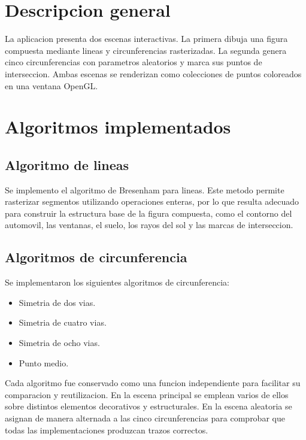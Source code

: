 \documentclass[12pt,a4paper]{article}
\begin{document}
\section{Descripcion general}

La aplicacion presenta dos escenas interactivas. La primera dibuja una figura compuesta mediante lineas y circunferencias rasterizadas. La segunda genera cinco circunferencias con parametros aleatorios y marca sus puntos de interseccion. Ambas escenas se renderizan como colecciones de puntos coloreados en una ventana OpenGL.

\section{Algoritmos implementados}

\subsection{Algoritmo de lineas}

Se implemento el algoritmo de Bresenham para lineas. Este metodo permite rasterizar segmentos utilizando operaciones enteras, por lo que resulta adecuado para construir la estructura base de la figura compuesta, como el contorno del automovil, las ventanas, el suelo, los rayos del sol y las marcas de interseccion.

\subsection{Algoritmos de circunferencia}

Se implementaron los siguientes algoritmos de circunferencia:

\begin{itemize}
	\item Simetria de dos vias.
	\item Simetria de cuatro vias.
	\item Simetria de ocho vias.
	\item Punto medio.
\end{itemize}

Cada algoritmo fue conservado como una funcion independiente para facilitar su comparacion y reutilizacion. En la escena principal se emplean varios de ellos sobre distintos elementos decorativos y estructurales. En la escena aleatoria se asignan de manera alternada a las cinco circunferencias para comprobar que todas las implementaciones produzcan trazos correctos.
\end{document}

